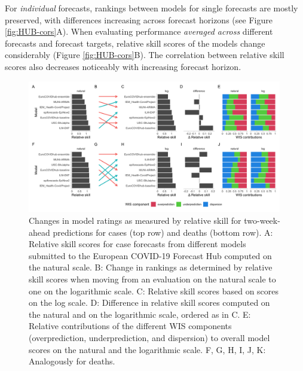 \documentclass{article}
\begin{document}
For \textit{individual} forecasts, rankings between models for single forecasts are mostly preserved, with differences increasing across forecast horizons (see Figure \ref{fig:HUB-cors}A). When evaluating performance \textit{averaged across} different forecasts and forecast targets, relative skill scores of the models change considerably (Figure \ref{fig:HUB-cors}B). The correlation between relative skill scores also decreases noticeably with increasing forecast horizon. 

\begin{figure}[h!]
    \centering
    \includegraphics[width=0.99\textwidth]{output/figures/HUB-pairwise-comparisons.png}
    \caption{Changes in model ratings as measured by relative skill for two-week-ahead predictions for cases (top row) and deaths (bottom row). A: Relative skill scores for case forecasts from different models submitted to the European COVID-19 Forecast Hub computed on the natural scale. B: Change in rankings as determined by relative skill scores when moving from an evaluation on the natural scale to one on the logarithmic scale. C: Relative skill scores based on scores on the log scale. D: Difference in relative skill scores computed on the natural and on the logarithmic scale, ordered as in C. E: Relative contributions of the different WIS components (overprediction, underprediction, and dispersion) to overall model scores on the natural and the logarithmic scale. F, G, H, I, J, K: Analogously for deaths.}
    \label{fig:HUB-rank-order}
\end{figure}
\end{document}
